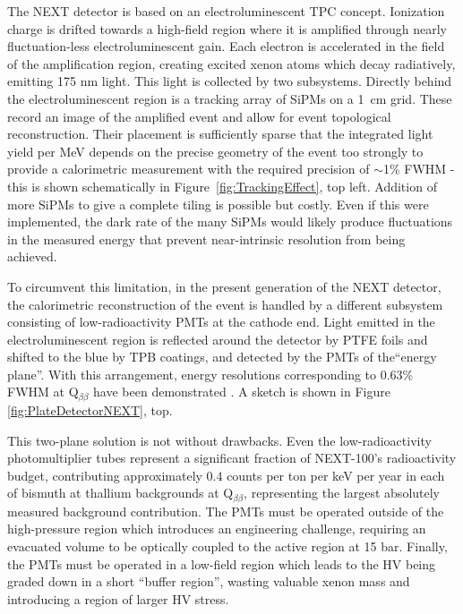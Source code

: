 The NEXT detector is based on an electroluminescent TPC concept. Ionization charge is drifted towards a high-field region where it is amplified through nearly fluctuation-less electroluminescent gain.  Each electron is accelerated in the field of the amplification region, creating excited xenon atoms which decay radiatively, emitting 175 nm light.  This light is collected by two subsystems. Directly behind the electroluminescent region is a tracking array of SiPMs on a 1~cm grid.  These record an image of the amplified event and allow for event topological reconstruction.  Their placement is sufficiently sparse that the integrated light yield per MeV depends on the precise geometry of the event too strongly to provide a calorimetric measurement with the required precision of $\sim$1\% FWHM - this is shown schematically in Figure~\ref{fig:TrackingEffect}, top left.  Addition of more SiPMs to give a complete tiling is possible but costly.  Even if this were implemented, the dark rate of the many SiPMs would likely produce fluctuations in the measured energy that prevent near-intrinsic resolution from being achieved.  

To circumvent this limitation, in the present generation of the NEXT detector, the calorimetric reconstruction of the event is handled by a different subsystem consisting of low-radioactivity PMTs at the cathode end.  Light emitted in the electroluminescent region is reflected around the detector by PTFE foils and shifted to the blue by TPB coatings, and detected by the PMTs of the``energy plane''.  With this arrangement, energy resolutions corresponding to  0.63\% FWHM at Q$_{\beta\beta}$ have been demonstrated \cite{Alvarez:2012yxw}.  A sketch is shown in Figure~ \ref{fig:PlateDetectorNEXT}, top.






This two-plane solution is not without drawbacks. Even the low-radioactivity photomultiplier tubes represent a significant fraction of NEXT-100's radioactivity budget, contributing approximately 0.4 counts per ton per keV per year in each of bismuth at thallium backgrounds at Q$_{\beta\beta}$, representing the largest absolutely measured background contribution.  The PMTs must be operated outside of the high-pressure region which introduces an engineering challenge, requiring an evacuated volume to be optically coupled to the active region at 15 bar. Finally, the PMTs must be operated in a low-field region which leads to the HV being graded down in a short ``buffer region'', wasting valuable xenon mass and introducing a region of larger HV stress.


